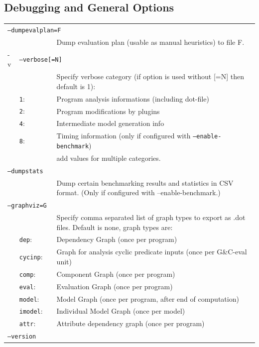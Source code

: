 \documentclass[a4paper, titlepage]{article}
\begin{document}
\subsection{Debugging and General Options}
\begin{center}
\begin{longtable}{p{2.2cm}  p{2.5cm} p{0.6cm} p{6.3cm}  }
\multicolumn{4}{l}{\texttt{--dumpevalplan=F}}\\
& & & Dump evaluation plan (usable as manual heuristics) to file F.\\
-v& \multicolumn{3}{l}{\texttt{--verbose[=N]}}\\
& & & Specify verbose category (if option is used without [=N] then default is 1):\\
&\texttt{1}:&& Program analysis informations (including dot-file)\\
&\texttt{2}:&& Program modifications by plugins\\
&\texttt{4}:&& Intermediate model generation info\\
&\texttt{8}:&& Timing information (only if configured with \texttt{--enable-benchmark})\\
&&&add values for multiple categories.\\
\multicolumn{4}{l}{\texttt{--dumpstats}}\\
& & & Dump certain benchmarking results and statistics in CSV format. (Only if configured with --enable-benchmark.)\\
\multicolumn{4}{l}{\texttt{--graphviz=G}}\\
& & & Specify comma separated list of graph types to export as .dot files. Default is none, graph types are:\\
&\texttt{dep}:&& Dependency Graph (once per program)\\
&\texttt{cycinp}:&& Graph for analysis cyclic predicate inputs (once per G\&C-eval unit)\\
&\texttt{comp}:&& Component Graph (once per program)\\
&\texttt{eval}:&& Evaluation Graph (once per program)\\
&\texttt{model}:&& Model Graph (once per program, after end of computation)\\
&\texttt{imodel}:&& Individual Model Graph (once per model)\\
&\texttt{attr}:&& Attribute dependency graph (once per program)\\
\multicolumn{4}{l}{\texttt{--version}}\\

\end{longtable}
\end{center}
\end{document}
